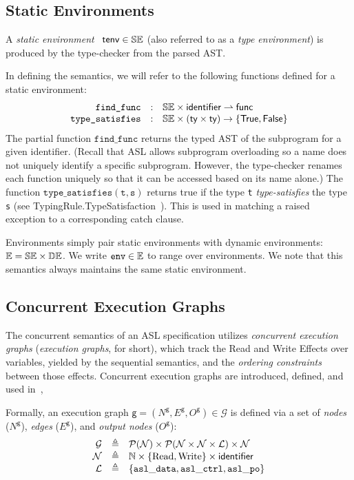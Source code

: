 \documentclass{book}
\newcommand\xgraph[0]{\textsf{g}}
\newcommand\Nodes[0]{\mathcal{N}}
\newcommand\Read[0]{\text{Read}}
\newcommand\Write[0]{\text{Write}}
\newcommand\Labels[0]{\mathcal{L}}
\newcommand\XGraphs[0]{\mathcal{G}}
\newcommand\tenv[0]{\textsf{tenv}}
\newcommand\findfunc[0]{\texttt{find\_func}}
\newcommand\typesatisfies[0]{\texttt{type\_satisfies}}
\newcommand\env[0]{\texttt{env}}
\begin{document}
\subsection{Static Environments \label{sec:staticenvironments}}

A \emph{static environment}~\cite{ASLTypingReference} $\tenv \in \staticenvs$ (also referred to as a \emph{type environment})
is produced by the type-checker from the parsed AST.

In defining the semantics, we will refer to the following functions defined for a static environment:
\[
  \begin{array}{rcl}
    \findfunc       &:& \staticenvs \times \identifier \partialto \func\\
    \typesatisfies  &:& \staticenvs \times (\ty \times \ty) \rightarrow \{\True, \False\}
  \end{array}
\]
The partial function $\findfunc$ returns the typed AST of the subprogram for a given identifier.
(Recall that ASL allows subprogram overloading so a name does not uniquely identify
a specific subprogram.
However, the type-checker renames each function uniquely so that it can be accessed based
on its name alone.)
%
The function $\typesatisfies(\texttt{t}, \texttt{s})$ returns true
if the type \texttt{t} \emph{type-satisfies} the type \texttt{s}
(see TypingRule.TypeSatisfaction~\cite{ASLTypingReference}).
This is used in matching a raised exception to a corresponding catch clause.

Environments simply pair static environments with dynamic environments:
$\mathbb{E} = \mathbb{SE} \times \mathbb{DE}$. We write $\env \in \envs$ to range over environments.
%
We note that this semantics always maintains the same static environment.

\subsection{Concurrent Execution Graphs \label{sec:concurrentexecutiongraphs}}

The concurrent semantics of an ASL specification utilizes \emph{concurrent execution graphs}
(\emph{execution graphs}, for short),
which track the Read and Write Effects over variables, yielded by the sequential semantics, and the \emph{ordering constraints}
between those effects.
Concurrent execution graphs are introduced, defined, and used in~\cite{AlglaveMT14,alglave2016syntax,AlglaveDGHM21},

Formally, an execution graph $\xgraph = (N^\xgraph, E^\xgraph, O^\xgraph) \in \XGraphs$
is defined via a set of \emph{nodes} ($N^\xgraph$), \emph{edges} ($E^\xgraph$), and \emph{output nodes} ($O^\xgraph$):
\[
\begin{array}{rcl}
  \XGraphs   	    &\triangleq& \pow{\Nodes} \times \pow{\Nodes \times \Nodes \times \Labels} \times \Nodes  \\
  \Nodes            &\triangleq& \N \times \{ \Read, \Write \} \times \identifier \\
  \Labels           &\triangleq& \{ \asldata, \aslctrl, \aslpo \}
\end{array}
\]
\end{document}
